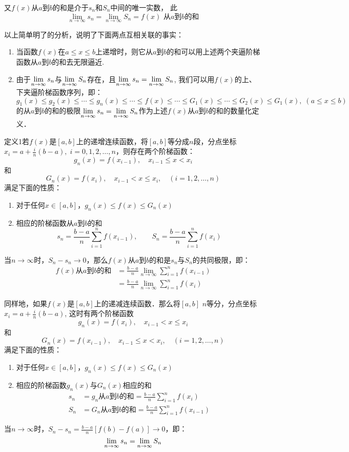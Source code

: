 \begin{solution}
又$f(x)$从$a$到$b$的和是介于$s_n$和$S_n$中间的唯一实数，
此
\[\lim_{n\to\infty} s_n=\lim_{n\to\infty} S_n=f(x)\text{ 从$a$到$b$的和}\]

以上简单明了的分析，说明了下面两点互相关联的事实：
\begin{enumerate}
    \item 当函数$f(x)$在$a\le x\le b$上递增时，则它从$a$到$b$的和可以用上述两个夹逼阶梯函数从$a$到$b$的和去无限逼近.
    \item 由于$\displaystyle\lim_{n\to\infty}s_n$与$\displaystyle\lim_{n\to\infty}S_n$存在，且$\displaystyle\lim_{n\to\infty}s_n=\displaystyle\lim_{n\to\infty}S_n$, 我们可以用$f(x)$的上、下夹逼阶梯函数序列，即：$g_1 (x)\le g_2(x)\le \cdots\le g_n(x)\le \cdots\le f(x)\le \cdots\le G_1(x)\le \cdots\le G_2(x)\le G_1(x),\; (a\le x\le b)$的从$a$到$b$的和的极限$\displaystyle\lim_{n\to\infty}s_n=\displaystyle\lim_{n\to\infty}S_n$作为上述$f(x)$从$a$到$b$的和的数量化定义．
\end{enumerate}
\end{solution}

\begin{blk}
    {定义1}若$f(x)$是$[a,b]$上的递增连续函数，将$[a,b]$等分成$n$段，分点坐标$x_i=a+\frac{i}{n}(b-a),\; i=0,1, 2,\ldots,n$，则存在两个阶梯函数：
\[    g_n (x) =f (x_{i-1}) ,\quad x_{i-1}\le  x< x_i\]
    和
\[    G_n (x)=f(x_i),\quad x_{i-1}<x\le x_i,\quad (i=1,2,\ldots,n)\]
满足下面的性质：
\begin{enumerate}
    \item 对于任何$x\in[a,b]$，$g_n(x)\le f(x)\le G_n(x)$
    \item 相应的阶梯函数从$a$到$b$的和
\[s_n=\frac{b-a}{n}\sum^n_{i=1}f(x_{i-1}),\qquad S_n=\frac{b-a}{n}\sum^n_{i=1}f(x_{i})  \]
\end{enumerate}
当$n\to\infty$时，$S_n-s_n\to 0$，那么$f(x)$从$a$到$b$的和是$s_n$与$S_n$的共同极限，即：
\[\begin{split}
f(x)\text{从$a$到$b$的和}&=\frac{b-a}{n}\lim_{n\to\infty}\sum^n_{i=1}f(x_{i-1})\\
&=\frac{b-a}{n}\lim_{n\to\infty}\sum^n_{i=1}f(x_{i})
\end{split}\]

同样地，如果$f(x)$是$[a,b]$上的递减连续函数．那么将$[a,b]$ $n$等分，分点坐标$x_i=a+\frac{i}{n}(b-a)$, 这时有两个阶梯函数
\[    g_n (x) =f (x_{i}) ,\quad x_{i-1}<  x\le x_i\]
    和
\[    G_n (x)=f(x_{i-1}),\quad x_{i-1}\le x< x_i,\quad (i=1,2,\ldots,n)\]
满足下面的性质：
\begin{enumerate}
    \item 对于任何$x\in[a,b]$，$g_n(x)\le f(x)\le G_n(x)$
    \item 相应的阶梯函数$g_n(x)$与$G_n(x)$相应的和
\[\begin{split}
    s_n&=g_n\text{从$a$到$b$的和}=\frac{b-a}{n}\sum^n_{i=1}f(x_{i})\\
    S_n&=G_n\text{从$a$到$b$的和}=\frac{b-a}{n}\sum^n_{i=1}f(x_{i-1})  
\end{split}\]
\end{enumerate}
当$n\to\infty$时，$S_n-s_n=\frac{b-a}{n}\left[f(b)-f(a)\right]\to 0$，即：
\[\displaystyle\lim_{n\to\infty}s_n=\displaystyle\lim_{n\to\infty}S_n\]
\end{blk}

